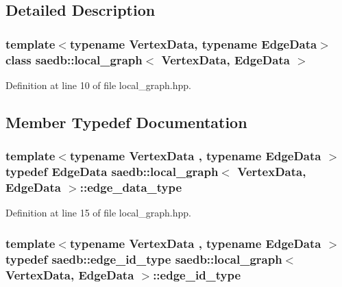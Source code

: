 \subsection{Detailed Description}
\subsubsection*{template$<$typename Vertex\-Data, typename Edge\-Data$>$class saedb\-::local\-\_\-graph$<$ Vertex\-Data, Edge\-Data $>$}



Definition at line 10 of file local\-\_\-graph.\-hpp.



\subsection{Member Typedef Documentation}
\hypertarget{classsaedb_1_1local__graph_a40ea4338f0e7fcd205b83b41e3f86e8c}{
\subsubsection[{edge\-\_\-data\-\_\-type}]{\setlength{\rightskip}{0pt plus 5cm}template$<$typename Vertex\-Data , typename Edge\-Data $>$ typedef Edge\-Data {\bf saedb\-::local\-\_\-graph}$<$ Vertex\-Data, Edge\-Data $>$\-::{\bf edge\-\_\-data\-\_\-type}}}\label{d9/d4a/classsaedb_1_1local__graph_a40ea4338f0e7fcd205b83b41e3f86e8c}


Definition at line 15 of file local\-\_\-graph.\-hpp.

\hypertarget{classsaedb_1_1local__graph_a947191fe9f882212df867404c43d1c7a}{
\subsubsection[{edge\-\_\-id\-\_\-type}]{\setlength{\rightskip}{0pt plus 5cm}template$<$typename Vertex\-Data , typename Edge\-Data $>$ typedef {\bf saedb\-::edge\-\_\-id\-\_\-type} {\bf saedb\-::local\-\_\-graph}$<$ Vertex\-Data, Edge\-Data $>$\-::{\bf edge\-\_\-id\-\_\-type}}}\label{d9/d4a/classsaedb_1_1local__graph_a947191fe9f882212df867404c43d1c7a}


